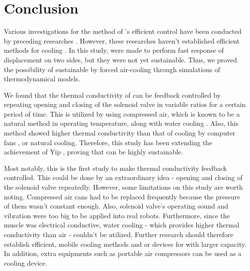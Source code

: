 \section{Conclusion}
Various investigations for the method of \scpnospace's efficient control have been conducted by preceding researches \cite{haines,mirvakili,yip}. %
However, these researches haven't established efficient methods for cooling \scpnospace. %
In this study, \antas were made to perform fast response of displacement on two sides, but they were not yet sustainable. Thus, we proved the possibility of sustainable \apc by forced air-cooling through simulations of thermodynamical models. %

We found that the thermal conductivity of \scp can be feedback controlled by repeating opening and closing of the solenoid valve in variable ratios for a certain period of time. %
This is utilized by using compressed air, which is known to be a natural method in operating temperature, along with water cooling \cite{madden}.
Also, this method showed higher thermal conductivity than that of cooling by computer fans \cite{yip}, or natural cooling.
Therefore, this study has been extending the achievement of Yip \etal, proving that \apc can be highly sustainable.

Most notably, this is the first study to make thermal conductivity feedback controlled. 
This could be done by an extraordinary idea - opening and closing of the solenoid valve repeatedly.
However, some limitations on this study are worth noting. 
Compressed air cans had to be replaced frequently because the pressure of them wasn't constant enough. 
Also, solenoid valve's operating sound and vibration were too big to be applied into real robots.
Furthermore, since the muscle was electrical conductive, water cooling - which provides higher thermal conductivity than air \cite{finger} - couldn't be utilized.
Further research should therefore establish efficient, mobile cooling methods and or devices for \scps with larger capacity. 
In addition, extra equipments such as portable air compressors can be used as a cooling device.



